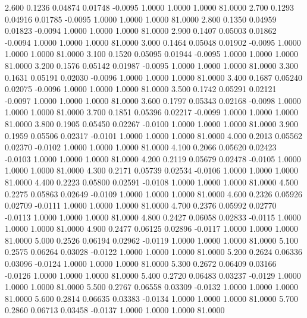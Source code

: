    2.600   0.1236   0.04874   0.01748  -0.0095   1.0000   1.0000   1.0000  81.0000
   2.700   0.1293   0.04916   0.01785  -0.0095   1.0000   1.0000   1.0000  81.0000
   2.800   0.1350   0.04959   0.01823  -0.0094   1.0000   1.0000   1.0000  81.0000
   2.900   0.1407   0.05003   0.01862  -0.0094   1.0000   1.0000   1.0000  81.0000
   3.000   0.1464   0.05048   0.01902  -0.0095   1.0000   1.0000   1.0000  81.0000
   3.100   0.1520   0.05095   0.01944  -0.0095   1.0000   1.0000   1.0000  81.0000
   3.200   0.1576   0.05142   0.01987  -0.0095   1.0000   1.0000   1.0000  81.0000
   3.300   0.1631   0.05191   0.02030  -0.0096   1.0000   1.0000   1.0000  81.0000
   3.400   0.1687   0.05240   0.02075  -0.0096   1.0000   1.0000   1.0000  81.0000
   3.500   0.1742   0.05291   0.02121  -0.0097   1.0000   1.0000   1.0000  81.0000
   3.600   0.1797   0.05343   0.02168  -0.0098   1.0000   1.0000   1.0000  81.0000
   3.700   0.1851   0.05396   0.02217  -0.0099   1.0000   1.0000   1.0000  81.0000
   3.800   0.1905   0.05450   0.02267  -0.0100   1.0000   1.0000   1.0000  81.0000
   3.900   0.1959   0.05506   0.02317  -0.0101   1.0000   1.0000   1.0000  81.0000
   4.000   0.2013   0.05562   0.02370  -0.0102   1.0000   1.0000   1.0000  81.0000
   4.100   0.2066   0.05620   0.02423  -0.0103   1.0000   1.0000   1.0000  81.0000
   4.200   0.2119   0.05679   0.02478  -0.0105   1.0000   1.0000   1.0000  81.0000
   4.300   0.2171   0.05739   0.02534  -0.0106   1.0000   1.0000   1.0000  81.0000
   4.400   0.2223   0.05800   0.02591  -0.0108   1.0000   1.0000   1.0000  81.0000
   4.500   0.2275   0.05863   0.02649  -0.0109   1.0000   1.0000   1.0000  81.0000
   4.600   0.2326   0.05926   0.02709  -0.0111   1.0000   1.0000   1.0000  81.0000
   4.700   0.2376   0.05992   0.02770  -0.0113   1.0000   1.0000   1.0000  81.0000
   4.800   0.2427   0.06058   0.02833  -0.0115   1.0000   1.0000   1.0000  81.0000
   4.900   0.2477   0.06125   0.02896  -0.0117   1.0000   1.0000   1.0000  81.0000
   5.000   0.2526   0.06194   0.02962  -0.0119   1.0000   1.0000   1.0000  81.0000
   5.100   0.2575   0.06264   0.03028  -0.0122   1.0000   1.0000   1.0000  81.0000
   5.200   0.2624   0.06336   0.03096  -0.0124   1.0000   1.0000   1.0000  81.0000
   5.300   0.2672   0.06409   0.03166  -0.0126   1.0000   1.0000   1.0000  81.0000
   5.400   0.2720   0.06483   0.03237  -0.0129   1.0000   1.0000   1.0000  81.0000
   5.500   0.2767   0.06558   0.03309  -0.0132   1.0000   1.0000   1.0000  81.0000
   5.600   0.2814   0.06635   0.03383  -0.0134   1.0000   1.0000   1.0000  81.0000
   5.700   0.2860   0.06713   0.03458  -0.0137   1.0000   1.0000   1.0000  81.0000
